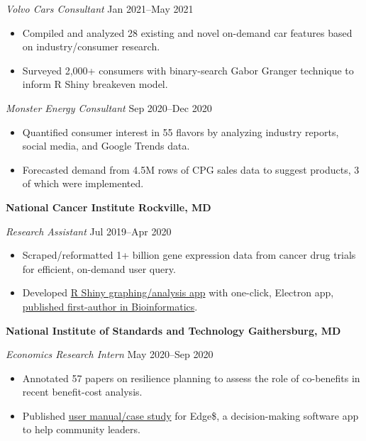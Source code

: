 \documentclass[11pt]{article}
\begin{document}
\textit{Volvo Cars Consultant} \hfill Jan 2021--May 2021
\begin{itemize}
	\item Compiled and analyzed 28 existing and novel on-demand car features based on industry/consumer research.
	\item Surveyed 2,000+ consumers with binary-search Gabor Granger technique to inform R Shiny breakeven model.
\end{itemize}\par

\textit{Monster Energy Consultant} \hfill Sep 2020--Dec 2020
\begin{itemize}
	\item Quantified consumer interest in 55 flavors by analyzing industry reports, social media, and Google Trends data.
	\item Forecasted demand from 4.5M rows of CPG sales data to suggest products, 3 of which were implemented.
\end{itemize}\par

\textbf{National Cancer Institute \hfill Rockville, MD}\par

\textit{Research Assistant} \hfill Jul 2019--Apr 2020 \par
\begin{itemize}
	\item Scraped/reformatted 1+ billion gene expression data from cancer drug trials for efficient, on-demand user query.
	\item Developed \href{https://github.com/petezh/TP-Workbench}{R Shiny graphing/analysis  app} with one-click, Electron app, \href{https://academic.oup.com/bioinformatics/advance-article/doi/10.1093/bioinformatics/btab619/6358719?login=true}{published first-author in Bioinformatics}.
\end{itemize}\par

\textbf{National Institute of Standards and Technology \hfill Gaithersburg, MD}\par

\textit{Economics Research Intern} \hfill May 2020--Sep 2020
\begin{itemize}
	\item Annotated 57 papers on resilience planning to assess the role of co-benefits in recent benefit-cost analysis.
	\item Published \href{https://nvlpubs.nist.gov/nistpubs/SpecialPublications/NIST.SP.1260.pdf}{user manual/case study} for Edge\$, a decision-making software app to help community leaders.
\end{itemize}\par
\end{document}
